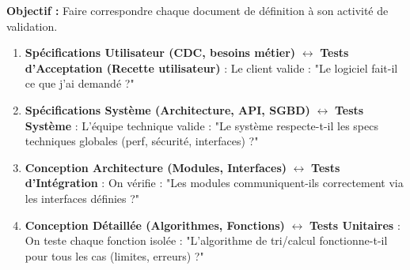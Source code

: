 \documentclass[11pt]{article}
\begin{document}
\begin{methode}
\textbf{Objectif :} Faire correspondre chaque document de définition à son activité de validation.
\begin{enumerate}
    \item \textbf{Spécifications Utilisateur (CDC, besoins métier)} $\leftrightarrow$ \textbf{Tests d'Acceptation (Recette utilisateur)} : Le client valide : "Le logiciel fait-il ce que j'ai demandé ?"
    \item \textbf{Spécifications Système (Architecture, API, SGBD)} $\leftrightarrow$ \textbf{Tests Système} : L'équipe technique valide : "Le système respecte-t-il les specs techniques globales (perf, sécurité, interfaces) ?"
    \item \textbf{Conception Architecture (Modules, Interfaces)} $\leftrightarrow$ \textbf{Tests d'Intégration} : On vérifie : "Les modules communiquent-ils correctement via les interfaces définies ?"
    \item \textbf{Conception Détaillée (Algorithmes, Fonctions)} $\leftrightarrow$ \textbf{Tests Unitaires} : On teste chaque fonction isolée : "L'algorithme de tri/calcul fonctionne-t-il pour tous les cas (limites, erreurs) ?"
\end{enumerate}
\end{methode}
\end{document}
